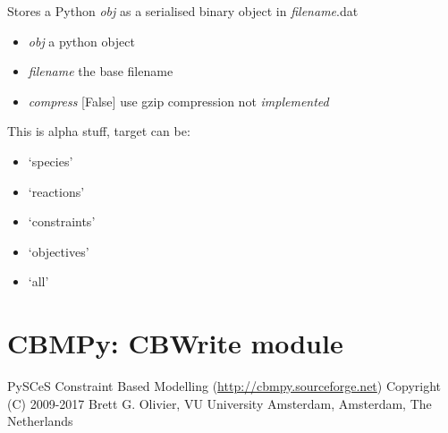 \documentclass[a4paper,11pt,english]{sphinxmanual}
\begin{document}

\begin{fulllineitems}
\label{modules_doc:cbmpy.CBTools.storeObj}
Stores a Python \emph{obj} as a serialised binary object in \emph{filename}.dat
\begin{itemize}
\item {} 
\emph{obj} a python object

\item {} 
\emph{filename} the base filename

\item {} 
\emph{compress} {[}False{]} use gzip compression not \emph{implemented}

\end{itemize}

\end{fulllineitems}


\begin{fulllineitems}
\label{modules_doc:cbmpy.CBTools.stringReplace}
This is alpha stuff, target can be:
\begin{itemize}
\item {} 
`species'

\item {} 
`reactions'

\item {} 
`constraints'

\item {} 
`objectives'

\item {} 
`all'

\end{itemize}

\end{fulllineitems}

\label{modules_doc:module-cbmpy.CBWrite}

\section{CBMPy: CBWrite module}
\label{modules_doc:cbmpy-cbwrite-module}
PySCeS Constraint Based Modelling (\url{http://cbmpy.sourceforge.net})
Copyright (C) 2009-2017 Brett G. Olivier, VU University Amsterdam, Amsterdam, The Netherlands
\end{document}
